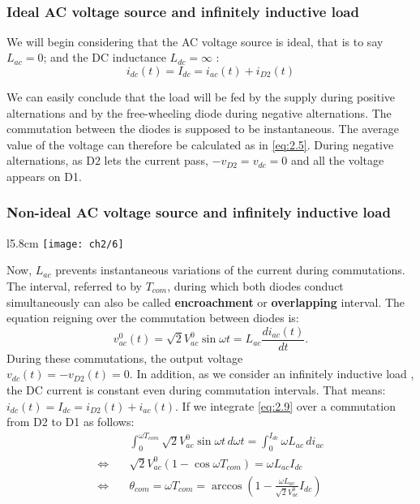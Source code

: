 		\ \\
		\subsubsection{Ideal AC voltage source and infinitely inductive load}
		
		    We will begin considering that the AC voltage source is ideal, that is to say $L_{ac} = 0$; and the DC inductance $L_{dc} = \infty$ : 
			\begin{equation}
				i_{dc}(t) = I_{dc} = i_{ac}(t) + i_{D2}(t)
			\end{equation}
			
			We can easily conclude that the load will be fed by the supply during positive alternations and by the free-wheeling diode during negative alternations. The commutation between the diodes is supposed to be instantaneous. The average value of the voltage can therefore be calculated as in \eqref{eq:2.5}. During negative alternations, as D2 lets the current pass, $-v_{D2} = v_{dc} = 0$ and all the voltage appears on D1.  
			
		\subsubsection{Non-ideal AC voltage source and infinitely inductive load}
			\begin{wrapfigure}[10]{l}{5.8cm}
			\vspace{-5mm}
			\texttt{[image: ch2/6]}
			\end{wrapfigure}
			Now, $L_{ac}$ prevents instantaneous variations of the current during commutations. The interval, referred to by $T_{com}$, during which both diodes conduct simultaneously can also be called \textbf{encroachment} or \textbf{overlapping} interval. The equation reigning over the commutation between diodes is:
			\begin{equation}
				v_{ac}^0 (t) = \sqrt{2} V_{ac}^0 \sin \omega t = L_{ac}\frac{di_{ac}(t)}{dt}.
				\label{eq:2.9}
			\end{equation}
			During these commutations, the output voltage \\$v_{dc}(t) = - v_{D2}(t) = 0$. In addition, as we consider an infinitely inductive load , the DC current is constant even during commutation intervals. That means: $i_{dc}(t) = I_{dc} = i_{D2}(t) + i_{ac}(t)$.
			If we integrate \eqref{eq:2.9} over a commutation from D2 to D1 as follows: 
			\begin{equation}
			\begin{aligned}
				&\int _0 ^{\omega T_{com}} \sqrt{2} V_{ac}^0 \sin \omega t \, d\omega t = \int _0 ^{I_{dc}} \omega L_{ac}\, di_{ac} \\
				\Leftrightarrow \quad &\sqrt{2} V_{ac}^0 (1- \cos \omega T_{com}) = \omega L_{ac} I_{dc}\\
				\Leftrightarrow \quad &\theta _{com} = \omega T_{com} = \arccos \left( 1 - \frac{\omega L_{ac}}{\sqrt{2} V_{ac}^0}I_{dc} \right)
				\end{aligned}
			\end{equation}
			
